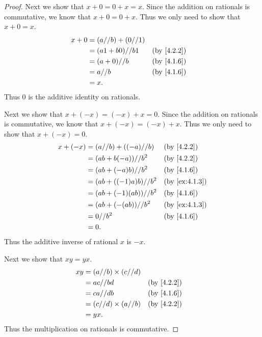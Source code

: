 \begin{proof}
  Next we show that \(x + 0 = 0 + x = x\).
  Since the addition on rationals is commutative, we know that \(x + 0 = 0 + x\).
  Thus we only need to show that \(x + 0 = x\).
  \begin{align*}
    x + 0 & = (a // b) + (0 // 1)                               \\
          & = (a1 + b0) // b1     &  & \text{(by \cref{4.2.2})} \\
          & = (a + 0) // b        &  & \text{(by \cref{4.1.6})} \\
          & = a // b              &  & \text{(by \cref{4.1.6})} \\
          & = x.
  \end{align*}
  Thus \(0\) is the additive identity on rationals.

  Next we show that \(x + (-x) = (-x) + x = 0\).
  Since the addition on rationals is commutative, we know that \(x + (-x) = (-x) + x\).
  Thus we only need to show that \(x + (-x) = 0\).
  \begin{align*}
    x + (-x) & = (a // b) + ((-a) // b) &  & \text{(by \cref{4.2.2})}    \\
             & = (ab + b(-a)) // b^2    &  & \text{(by \cref{4.2.2})}    \\
             & = (ab + (-a)b) // b^2    &  & \text{(by \cref{4.1.6})}    \\
             & = (ab + ((-1)a)b) // b^2 &  & \text{(by \cref{ex:4.1.3})} \\
             & = (ab + (-1)(ab)) // b^2 &  & \text{(by \cref{4.1.6})}    \\
             & = (ab + (-(ab)) // b^2   &  & \text{(by \cref{ex:4.1.3})} \\
             & = 0 // b^2               &  & \text{(by \cref{4.1.6})}    \\
             & = 0.
  \end{align*}
  Thus the additive inverse of rational \(x\) is \(-x\).

  Next we show that \(xy = yx\).
  \begin{align*}
    xy & = (a // b) \times (c // d)                               \\
       & = ac // bd                 &  & \text{(by \cref{4.2.2})} \\
       & = ca // db                 &  & \text{(by \cref{4.1.6})} \\
       & = (c // d) \times (a // b) &  & \text{(by \cref{4.2.2})} \\
       & = yx.
  \end{align*}
  Thus the multiplication on rationals is commutative.


\end{proof}
